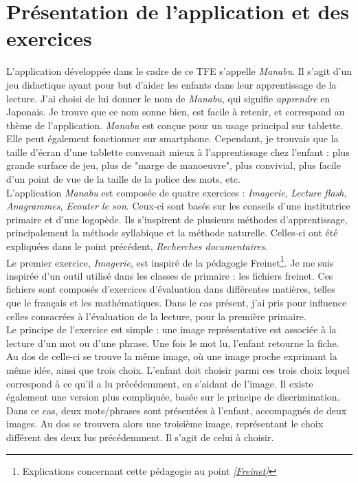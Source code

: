 \section{Présentation de l'application et des exercices}
L'application développée dans le cadre de ce TFE s'appelle \textit{Manabu}. Il s'agit d'un jeu didactique ayant pour but d'aider les enfants dans leur apprentissage de la lecture. J'ai choisi de lui donner le nom de \textit{Manabu}, qui signifie \textit{apprendre} en Japonais. Je trouve que ce nom sonne bien, est facile à retenir, et correspond au thème de l'application. 
\textit{Manabu} est conçue pour un usage principal sur tablette. Elle peut également fonctionner sur smartphone. Cependant, je trouvais que la taille d'écran d'une tablette convenait mieux à l'apprentissage chez l'enfant : plus grande surface de jeu, plus de "marge de manoeuvre", plus convivial, plus facile d'un point de vue de la taille de la police des mots, etc.\\

L'application \textit{Manabu} est composée de quatre exercices : \textit{Imagerie}, \textit{Lecture flash}, \textit{Anagrammes}, \textit{Ecouter le son}. Ceux-ci sont basés sur les conseils d'une institutrice primaire et d'une logopède. Ils s'inspirent de plusieurs méthodes d'apprentissage, principalement la méthode syllabique et  la méthode naturelle. Celles-ci ont été expliquées dans le point précédent, \textit{Recherches documentaires}.\\

Le premier exercice, \textit{Imagerie}, est inspiré de la pédagogie Freinet\footnote{Explications concernant cette pédagogie au point \textit{\ref{Freinet}}}. Je me suis inspirée d'un outil utilisé dans les classes de primaire : les fichiers freinet. Ces fichiers sont composés d'exercices d'évaluation dans différentes matières, telles que le français et les mathématiques. Dans le cas présent, j'ai pris pour influence celles consacrées à l'évaluation de la lecture, pour la première primaire.\\

Le principe de l'exercice est simple : une image représentative est associée à la lecture d'un mot ou d'une phrase. Une fois le mot lu, l'enfant retourne la fiche. Au dos de celle-ci se trouve la même image, où une image proche exprimant la même idée, ainsi que trois choix. L'enfant doit choisir parmi ces trois choix lequel correspond à ce qu'il a lu précédemment, en s'aidant de l'image. Il existe également une version plus compliquée, basée sur le principe de discrimination. Dans ce cas, deux mots/phrases sont présentées à l'enfant, accompagnés de deux images. Au dos se trouvera alors une troisième image, représentant le choix différent des deux lus précédemment. Il s'agit de celui à choisir.\\

